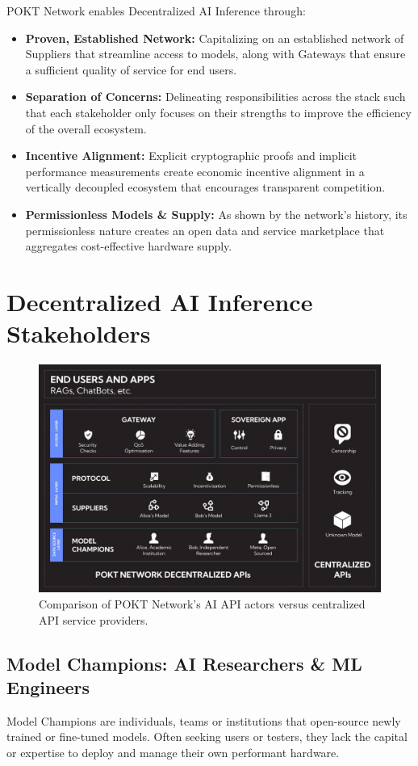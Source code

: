 \documentclass[conference,compsoc]{IEEEtran}
\begin{document}
POKT Network enables Decentralized AI Inference through:
\begin{itemize}
    \item \textbf{Proven, Established Network:} Capitalizing on an established network of Suppliers that streamline access to models, along with Gateways that ensure a sufficient quality of service for end users.
    \item \textbf{Separation of Concerns:} Delineating responsibilities across the stack such that each stakeholder only focuses on their strengths to improve the efficiency of the overall ecosystem.
    \item \textbf{Incentive Alignment:} Explicit cryptographic proofs and implicit performance measurements create economic incentive alignment in a vertically decoupled ecosystem that encourages transparent competition.
    \item \textbf{Permissionless Models \& Supply:} As shown by the network’s history, its permissionless nature creates an open data and service marketplace that aggregates cost-effective hardware supply.
\end{itemize}


\section{Decentralized AI Inference Stakeholders}

\begin{figure}[!h]
\centering
\includegraphics[width=0.9\linewidth]{stakeholders.jpeg}
\caption{Comparison of POKT Network's AI API actors versus centralized API service providers.}
\label{fig_sim}
\end{figure}

\subsection{Model Champions: AI Researchers \& ML Engineers}
Model Champions are individuals, teams or institutions that open-source newly trained or fine-tuned models. Often seeking users or testers, they lack the capital or expertise to deploy and manage their own performant hardware.
\end{document}
